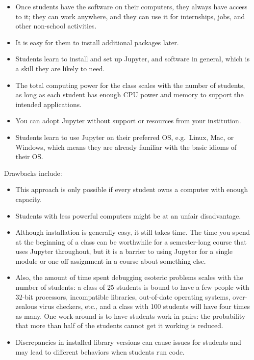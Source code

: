 \documentclass[]{book}
\providecommand{\tightlist}{%
  \setlength{\itemsep}{0pt}\setlength{\parskip}{0pt}}
\begin{document}
\begin{itemize}
\tightlist
\item
  Once students have the software on their computers, they always have
  access to it; they can work anywhere, and they can use it for
  internships, jobs, and other non-school activities.
\item
  It is easy for them to install additional packages later.
\item
  Students learn to install and set up Jupyter, and software in general,
  which is a skill they are likely to need.
\item
  The total computing power for the class scales with the number of
  students, as long as each student has enough CPU power and memory to
  support the intended applications.
\item
  You can adopt Jupyter without support or resources from your
  institution.
\item
  Students learn to use Jupyter on their preferred OS, e.g.~Linux, Mac,
  or Windows, which means they are already familiar with the basic
  idioms of their OS.
\end{itemize}

Drawbacks include:

\begin{itemize}
\tightlist
\item
  This approach is only possible if every student owns a computer with
  enough capacity.
\item
  Students with less powerful computers might be at an unfair
  disadvantage.
\item
  Although installation is generally easy, it still takes time. The time
  you spend at the beginning of a class can be worthwhile for a
  semester-long course that uses Jupyter throughout, but it is a barrier
  to using Jupyter for a single module or one-off assignment in a course
  about something else.
\item
  Also, the amount of time spent debugging esoteric problems scales with
  the number of students: a class of 25 students is bound to have a few
  people with 32-bit processors, incompatible libraries, out-of-date
  operating systems, over-zealous virus checkers, etc., and a class with
  100 students will have four times as many. One work-around is to have
  students work in pairs: the probability that more than half of the
  students cannot get it working is reduced.
\item
  Discrepancies in installed library versions can cause issues for
  students and may lead to different behaviors when students run code.
\end{itemize}
\end{document}
